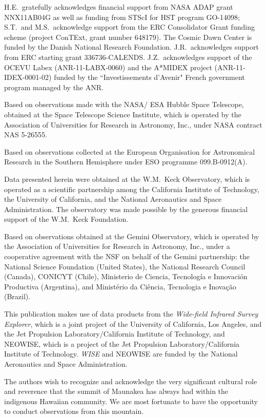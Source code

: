 \documentclass[twocolumn,times]{aastex61}
\begin{document}
\acknowledgments
H.E.\ gratefully acknowledges financial support from NASA ADAP grant NNX11AB04G as well as funding from STScI for HST program GO-14098; S.T.\ and M.S.\ acknowledge support from the ERC Consolidator Grant funding scheme (project ConTExt, grant number 648179). The Cosmic Dawn Center is funded by the Danish National Research Foundation. J.R.\ acknowledges support from ERC starting grant 336736-CALENDS. J.Z.\ acknowledges support of the OCEVU Labex (ANR-11-LABX-0060) and the A*MIDEX project (ANR-11-IDEX-0001-02) funded by the ``Investissements d'Avenir" French government program managed by the ANR.

Based on observations made with the NASA/ ESA Hubble Space Telescope, obtained at the Space Telescope Science Institute, which is operated by the Association of Universities for Research in Astronomy, Inc., under NASA contract NAS 5-26555. 

Based on observations collected at the European Organisation for Astronomical Research in the Southern Hemisphere under ESO programme 099.B-0912(A).

Data presented herein were obtained at the W.M.\ Keck Observatory, which is operated as a scientific partnership among the California Institute of Technology, the University of California, and the National Aeronautics and Space Administration. The observatory was made possible by the generous financial support of the W.M.\ Keck Foundation. 

Based on observations obtained at the Gemini Observatory, which is operated by the Association of Universities for Research in Astronomy, Inc., under a cooperative agreement with the NSF on behalf of the Gemini partnership: the National Science Foundation (United States), the National Research Council (Canada), CONICYT (Chile), Ministerio de Ciencia, Tecnolog\'{i}a e Innovaci\'{o}n Productiva (Argentina), and Minist\'{e}rio da Ci\^{e}ncia, Tecnologia e Inova\c{c}\~{a}o (Brazil).

This publication makes use of data products from the \textsl{Wide-field Infrared Survey Explorer}, which is a joint project of the University of California, Los Angeles, and the Jet Propulsion Laboratory/California Institute of Technology, and NEOWISE, which is a project of the Jet Propulsion Laboratory/California Institute of Technology. \textsl{WISE} and NEOWISE are funded by the National Aeronautics and Space Administration.

The authors wish to recognize and acknowledge the very significant cultural role and reverence that the summit of Maunakea has always had within the indigenous Hawaiian community.  We are most fortunate to have the opportunity to conduct observations from this mountain.
\end{document}
